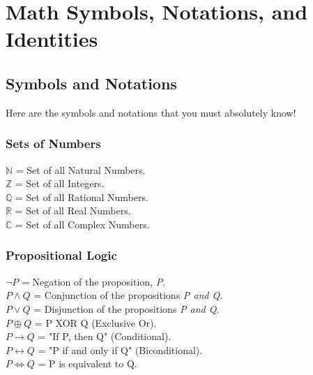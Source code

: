 \chapter{Math Symbols, Notations, and Identities}

\section{Symbols and Notations}
Here are the symbols and notations that you must absolutely know!

\subsection{Sets of Numbers}
\indent \indent $\mathbb{N}$ = Set of all Natural Numbers. \\
\indent $\mathbb{Z}$ = Set of all Integers. \\
\indent $\mathbb{Q}$ = Set of all Rational Numbers. \\
\indent $\mathbb{R}$ = Set of all Real Numbers. \\
\indent $\mathbb{C}$ = Set of all Complex Numbers.

\subsection{Propositional Logic}
\indent \indent $\neg P$ = Negation of the proposition, \emph{P}. \\
\indent $P \wedge Q$ = Conjunction of the propositions \emph{P and Q}. \\
\indent $P \vee Q$ = Disjunction of the propositions \emph{P and Q}. \\
\indent $P \oplus Q$ = P XOR Q (Exclusive Or). \\
\indent $P \rightarrow Q$ = "If P, then Q" (Conditional). \\
\indent $P \leftrightarrow Q$ = "P if and only if Q" (Biconditional). \\
\indent $P \Leftrightarrow Q$ = P is equivalent to Q. \\ \\ \\ \\

\pagebreak[4]

